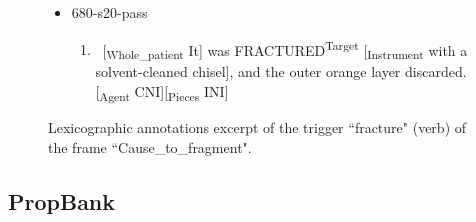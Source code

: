 \documentclass[xcolor=table]{beamer}
\begin{document}
\begin{frame}
\begin{figure}
\begin{tcolorbox}[colback=white, colframe=blue, boxrule=1pt, text width=.91\textwidth]
\begin{itemize}
			\item 680-s20-pass
			\begin{enumerate}\tiny
				\item \ [\textsubscript{\color{red}Whole\_patient} It] was FRACTURED\textsuperscript{\color{red}Target} [\textsubscript{\color{red}Instrument} with a solvent-cleaned chisel], and the outer orange layer discarded. [\textsubscript{\color{red}Agent} CNI][\textsubscript{\color{red}Pieces} INI] 
			\end{enumerate}
			
		\end{itemize}\vspace{-6pt}
	\end{tcolorbox}\vspace{-6pt}

		\caption{Lexicographic annotations excerpt of the trigger ``fracture" (verb) of the frame ``Cause\_to\_fragment".}
	\end{figure}
	
\end{frame}

\subsection{PropBank}
\end{document}
